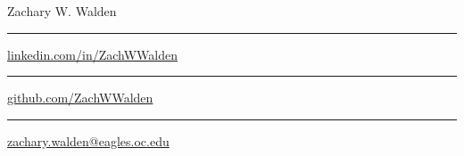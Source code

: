 \documentclass{article}
\newcommand\mybar{\kern1pt\rule[-\dp\strutbox]{.8pt}{\baselineskip}\kern1pt}
\begin{document}
\begin{center}
	\begin{huge}
		Zachary W. Walden\\
	\end{huge}
	\begin{large}
	\end{large}
	\begin{normalsize}
		 \mybar { } \faLinkedin \href{https://linkedin.com/in/ZachWWalden}{ linkedin.com/in/ZachWWalden} \mybar { } \faGithub \href{https://github.com/ZachWWalden}{ github.com/ZachWWalden}
		\mybar { }\faEnvelope\href{mailto::zachary.walden@eagles.oc.edu}{ zachary.walden@eagles.oc.edu}
	\end{normalsize}
\end{center}
\end{document}
